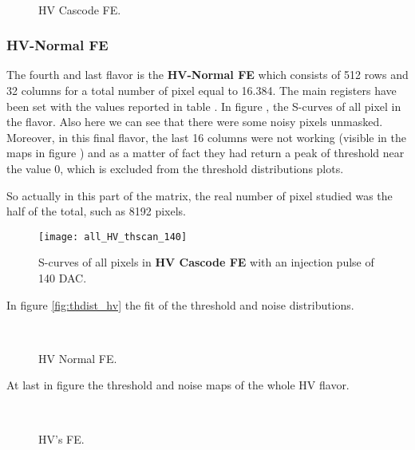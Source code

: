 \begin{figure}[h!]
\centering
{}\quad
{}\\
\caption{HV Cascode FE.}
\label{fig:thdist_hvc}
\end{figure}


\subsubsection{HV-Normal FE}

The fourth and last flavor is the \textbf{HV-Normal FE} which consists of 512 rows and 32 columns for a total number of pixel equal to 16.384. The main registers have been set with the values reported in table .
In figure , the S-curves of all pixel in the flavor. Also here we can see that there were some noisy pixels unmasked.
Moreover, in this final flavor, the last 16 columns were not working (visible in the maps in figure ) and as a matter of fact they had return a peak of threshold near the value 0, which is excluded from the threshold distributions plots.

So actually in this part of the matrix, the real number of pixel studied was the half of the total, such as 8192 pixels.


\begin{figure}[h!]
\centering
\texttt{[image: all\_HV\_thscan\_140]}
\caption{S-curves of all pixels in \textbf{HV Cascode FE} with an injection pulse of 140 DAC.}
\label{fig:hv_scurve_140}
\end{figure}

In figure \vref{fig:thdist_hv} the fit of the threshold and noise distributions.

\begin{figure}[h!]
\centering
{}\quad
{}\\
\caption{HV Normal FE.}
\label{fig:thdist_hv}
\end{figure}


At last in figure  the threshold and noise maps of the whole HV flavor.

\begin{figure}[h!]
\centering
{}\quad
{}\\
\caption{HV's FE.}
\label{fig:HVs_maps}
\end{figure}


